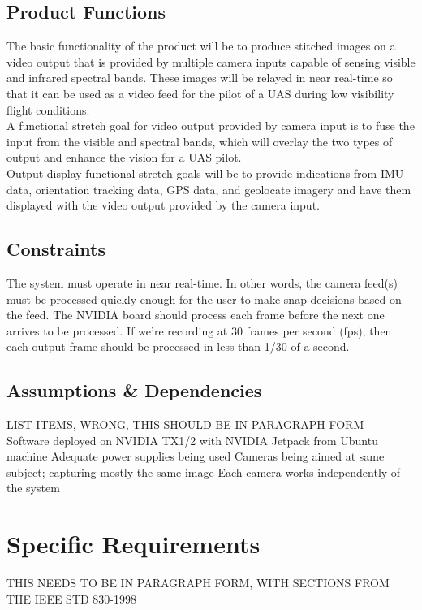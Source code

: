 \documentclass[letterpaper,10pt,serif,draftclsnofoot,onecolumn,compsoc,titlepage]{IEEEtran}
\begin{document}
\subsection{Product Functions}

The basic functionality of the product will be to produce stitched images on a video 
output that is provided by multiple camera inputs capable of sensing visible and 
infrared spectral bands. These images will be relayed in near real-time so that it 
can be used as a video feed for the pilot of a UAS during low visibility flight 
conditions. \\

A functional stretch goal for video output provided by camera input is to fuse the 
input from the visible and spectral bands, which will overlay the two types of output 
and enhance the vision for a UAS pilot. \\

Output display functional stretch goals will be to provide indications from IMU data, 
orientation tracking data, GPS data, and geolocate imagery and have them displayed 
with the video output provided by the camera input. \\

\subsection{Constraints}

The system must operate in near real-time. In other words, the camera feed(s) must be 
processed quickly enough for the user to make snap decisions based on the feed. The 
NVIDIA board should process each frame before the next one arrives to be processed. 
If we’re recording at 30 frames per second (fps), then each output frame should be 
processed in less than 1/30 of a second.\\

\subsection{Assumptions \& Dependencies}

LIST ITEMS, WRONG, THIS SHOULD BE IN PARAGRAPH FORM\\
Software deployed on NVIDIA TX1/2 with NVIDIA Jetpack from Ubuntu machine
Adequate power supplies being used
Cameras being aimed at same subject; capturing mostly the same image
Each camera works independently of the system

\section{Specific Requirements}
THIS NEEDS TO BE IN PARAGRAPH FORM, WITH SECTIONS FROM THE IEEE STD 830-1998\\
\end{document}
